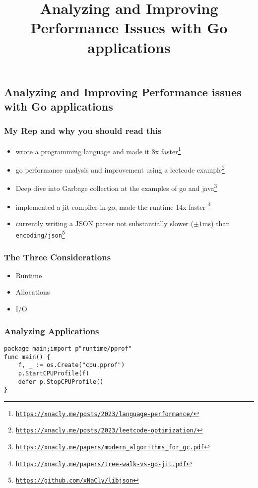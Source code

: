 

\title{Analyzing and Improving Performance Issues with Go applications}


    \subsection*{Analyzing and Improving Performance issues with Go applications}
    \subsubsection*{My Rep and why you should read this}
    \begin{itemize}
        \item wrote a programming language and made it 8x faster\footnote{\href{https://xnacly.me/posts/2023/language-performance/}{\texttt{https://xnacly.me/posts/2023/language-performance/}}}
        \item go performance analysis and improvement using a leetcode example\footnote{\href{https://xnacly.me/posts/2023/leetcode-optimization/}{\texttt{https://xnacly.me/posts/2023/leetcode-optimization/}}}
        \item Deep dive into Garbage collection at the examples of go and java\footnote{\href{https://xnacly.me/papers/modern_algorithms_for_gc.pdf}{\texttt{https://xnacly.me/papers/modern\_algorithms\_for\_gc.pdf}}}
        \item implemented a jit compiler in go, made the runtime 14x faster \footnote{\href{https://xnacly.me/papers/tree-walk-vs-go-jit.pdf}{\texttt{https://xnacly.me/papers/tree-walk-vs-go-jit.pdf}}}
        \item currently writing a JSON parser not substantially slower ($\pm1$ms) than \texttt{encoding/json}\footnote{\href{https://github.com/xNaCly/libjson}{\texttt{https://github.com/xNaCly/libjson}}}
    \end{itemize}
    \subsubsection*{The Three Considerations}
    \begin{itemize}
        \item Runtime
        \item Allocations
        \item I/O
    \end{itemize}
    \subsubsection*{Analyzing Applications}
    \begin{verbatim}
package main;import p"runtime/pprof"
func main() {
    f, _ := os.Create("cpu.pprof")
    p.StartCPUProfile(f)
    defer p.StopCPUProfile()
}
    \end{verbatim}
